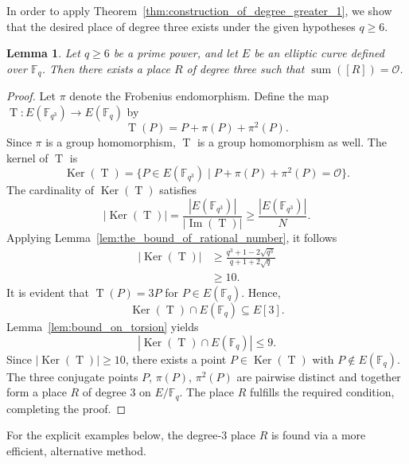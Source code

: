 \documentclass[journal,12pt,onecolumn]{IEEEtran}
\newtheorem{lemma}[theorem]{Lemma}
\newcommand{\Point}{\operatorname{sum}}
\begin{document}
In order to apply Theorem~\ref{thm:construction_of_degree_greater_1}, we show that the desired place of degree three exists under the given hypotheses $q \ge 6$.

\begin{lemma}\label{lem:existenceofdegree3place}
Let $q \ge 6$ be a prime power, and let $E$ be an elliptic curve defined over $\mathbb{F}_q$. Then there exists a place $R$ of degree three such that
$
\Point([R]) = \mathcal{O}$.
\end{lemma}


\begin{proof}
Let $\pi$ denote the Frobenius endomorphism. Define the map $\operatorname{T}: E(\mathbb{F}_{q^3}) \to E(\mathbb{F}_q)$ by
\[ \operatorname{T}(P) = P + \pi(P) + \pi^2(P).\]
Since $\pi$ is a group homomorphism, $\operatorname{T}$ is a group homomorphism as well. The kernel of $\operatorname{T}$ is
\[
\operatorname{Ker}(\operatorname{T}) = \{ P \in E(\mathbb{F}_{q^3}) \mid P + \pi(P) + \pi^2(P) = \mathcal{O} \}.
\]
 The cardinality of $\operatorname{Ker}(\operatorname{T})$ satisfies
\[
|\operatorname{Ker}(\operatorname{T})|
= \frac{|E(\mathbb{F}_{q^3})|}{|\operatorname{Im}(\operatorname{T})|} \ge \frac{|E(\mathbb{F}_{q^3})|}{N} .
\]
Applying Lemma~\ref{lem:the_bound_of_rational_number}, it follows
\begin{align*}
|\operatorname{Ker}(\operatorname{T})| &\ge \frac{q^3 + 1 - 2\sqrt{q^3}}{q + 1 + 2\sqrt{q}} \\
&\ge 10.
\end{align*}
It is evident that $ \operatorname{T}(P) = 3P  $ for $P \in  E(\mathbb{F}_q)$.
Hence,
\[
\operatorname{Ker}(\operatorname{T}) \cap E(\mathbb{F}_q) \subseteq E[3].
\]
Lemma~\ref{lem:bound_on_torsion} yields
\[
|\operatorname{Ker}(\operatorname{T}) \cap E(\mathbb{F}_q)| \le 9.
\]
Since $|\operatorname{Ker}(\operatorname{T})| \ge 10$, there exists a point $P \in \operatorname{Ker}(\operatorname{T})$ with $P \notin E(\mathbb{F}_q)$.
The three conjugate points $P$, $\pi(P)$, $\pi^2(P)$ are pairwise distinct and together form a place $ R $ of degree $3$ on $E/\mathbb{F}_q$.
The place $R$ fulfills the required condition, completing the proof.
\end{proof}
For the explicit examples below, the degree‑$3$ place $R$ is found via a more efficient, alternative method.
\end{document}
